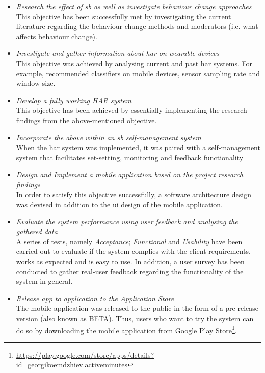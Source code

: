 \begin{itemize}
    \item \textit{Research the effect of \gls{sb} as well as investigate behaviour change approaches}\\
    This objective has been successfully met by investigating the current literature regarding the behaviour change methods and moderators (i.e. what affects behaviour change).
    \item \textit{Investigate and gather information about \gls{har} on wearable devices}\\
    This objective was achieved by analysing current and past \gls{har} systems. For example, recommended classifiers on mobile devices, sensor sampling rate and window size.
    \item \textit{Develop a fully working HAR system}\\
    This objective has been achieved by essentially implementing the research findings from the above-mentioned objective.
    \item \textit{Incorporate the above within an \gls{sb} self-management system}\\
    When the \gls{har} system was implemented, it was paired with a self-management system that facilitates set-setting, monitoring and feedback functionality
    \item \textit{Design and Implement a mobile application based on the project research findings}\\
    In order to satisfy this objective successfully, a software architecture design was devised in addition to the \gls{ui} design of the mobile application.
    
    \item \textit{Evaluate the system performance using user feedback and analysing the gathered data}\\
    A series of tests, namely \textit{Acceptance}; \textit{Functional} and \textit{Usability} have been carried out to evaluate if the system complies with the client requirements, works as expected and is easy to use. In addition, a user survey has been conducted to gather real-user feedback regarding the functionality of the system in general.
    
    \item \textit{Release app to application to the Application Store}\\
    The mobile application was released to the public in the form of a pre-release version (also known as BETA). Thus, users who want to try the system can do so by downloading the mobile application from Google Play Store\footnote{\url{https://play.google.com/store/apps/details?id=georgikoemdzhiev.activeminutes}}.
    
\end{itemize}

